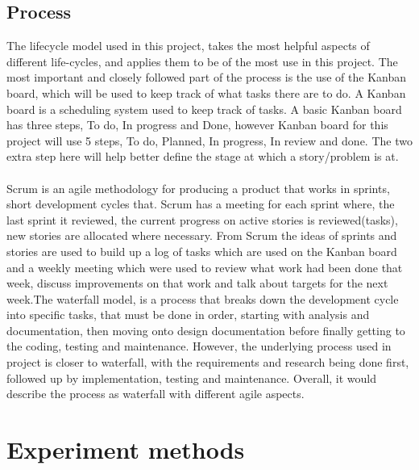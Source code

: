 \documentclass[a4paper,11pt]{article}
\begin{document}
\subsection{Process}
The lifecycle model used in this project, takes the most helpful aspects of different life-cycles, and applies them to be of the most use in this project. The most important and closely followed part of the process is the use of the Kanban board, which will be used to keep track of what tasks there are to do. 
A Kanban board is a scheduling system used to keep track of tasks. A basic Kanban board has three steps, To do, In progress and Done, however Kanban board for this project will use 5 steps, To do, Planned, In progress, In review and done. The two extra step here will help better define the stage at which a story/problem is at.\\\\
Scrum is an agile methodology for producing a product that works in sprints, short development cycles that. Scrum has a meeting for each sprint where, the last sprint it reviewed, the current progress on active stories is reviewed(tasks), new stories are allocated where necessary. From Scrum the ideas of sprints and stories are used to build up a log of tasks which are used on the Kanban board and a weekly meeting which were used to review what work had been done that week, discuss improvements on that work and talk about targets for the next week.\newline \newline The waterfall model, is a process that breaks down the development cycle into specific tasks, that must be done in order, starting with analysis and documentation, then moving onto design documentation before finally getting to the coding, testing and maintenance. However, the underlying process used in project is closer to waterfall, with the requirements and research being done first, followed up by implementation, testing and maintenance. Overall, it would describe the process as waterfall with different agile aspects.



\section{Experiment methods}
\end{document}

